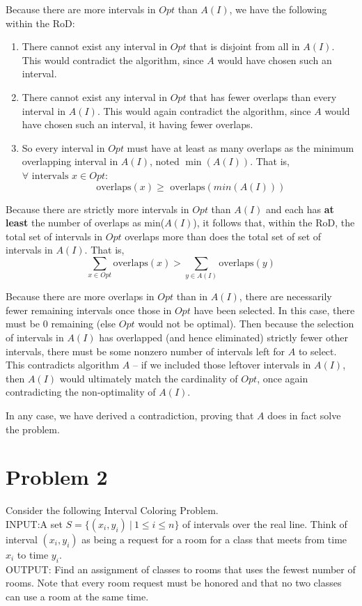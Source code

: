 \documentclass{article}
\begin{document}
    Because there are more intervals in $Opt$ than $A(I)$, we have the following within the RoD:
    
    \begin{enumerate}
        \item There cannot exist any interval in $Opt$ that is disjoint from all in $A(I)$. This would contradict the algorithm, since $A$ would have chosen such an interval.
        \item There cannot exist any interval in $Opt$ that has fewer overlaps than every interval in $A(I)$. This would again contradict the algorithm, since $A$ would have chosen such an interval, it having fewer overlaps.
        \item So every interval in $Opt$ must have at least as many overlaps as the minimum overlapping interval in $A(I)$, noted $\min(A(I))$.
        That is, $ \forall \text{ intervals } x \in Opt $:
        $$ \text{ overlaps}(x) \geq \text{ overlaps}(min(A(I))) $$
    \end{enumerate}
    
    Because there are strictly more intervals in $Opt$ than $A(I)$ and each has \textbf{at least} the number of overlaps as min($A(I)$), it follows that, within the RoD, the total set of intervals in $Opt$ overlaps more than does the total set of set of intervals in $A(I)$.
    That is, $$ \sum_{x \in Opt} \text{overlaps}(x) > \sum_{y \in A(I)} \text{overlaps}(y) $$
    
    Because there are more overlaps in $Opt$ than in $A(I)$, there are necessarily fewer remaining intervals once those in $Opt$ have been selected.
    In this case, there must be 0 remaining (else $Opt$ would not be optimal).
    Then because the selection of intervals in $A(I)$ has overlapped (and hence eliminated) strictly fewer other intervals, there must be some nonzero number of intervals left for $A$ to select.
    This contradicts algorithm $A$ -- if we included those leftover intervals in $A(I)$, then $A(I)$ would ultimately match the cardinality of $Opt$, once again contradicting the non-optimality of $A(I)$.
    
    In any case, we have derived a contradiction, proving that $A$ does in fact solve the problem.
    
    \section*{Problem 2}
    
    Consider the following Interval Coloring Problem.\\
    INPUT:A set $S = \{(x_i, y_i)\ |\ 1 \leq i \leq n\}$ of intervals over the real line. Think of interval $(x_i, y_i)$ as being a request for a room for a class that meets from time $x_i$ to time $y_i$.\\
    OUTPUT: Find an assignment of classes to rooms that uses the fewest number of rooms.
    Note that every room request must be honored and that no two classes can use a room at the same
    time.
    
\end{document}
